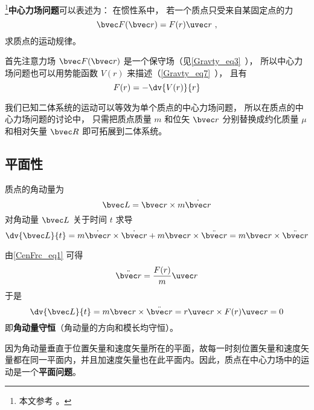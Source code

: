 
\footnote{本文参考 \cite{Goldstein}。}\textbf{中心力场问题}可以表述为： 在惯性系中， 若一个质点只受来自某固定点的力
\begin{equation}\label{CenFrc_eq1}
\bvec F(\bvec r) = F(r) \uvec r~,
\end{equation}
求质点的运动规律。

首先注意力场 $\bvec F(\bvec r)$ 是一个保守场（见\autoref{Gravty_eq3}~）， 所以中心力场问题也可以用势能函数 $V(r)$ 来描述（\autoref{Gravty_eq7}~）， 且有
\begin{equation}
F(r) = -\dv{V(r)}{r}
\end{equation}

我们已知二体系统的运动可以等效为单个质点的中心力场问题， 所以在质点的中心力场问题的讨论中， 只需把质点质量 $m$ 和位矢 $\bvec r$ 分别替换成约化质量 $\mu$ 和相对矢量 $\bvec R$ 即可拓展到二体系统。

\subsection{平面性}
质点的角动量为
\begin{equation}
\bvec L =\bvec r \times m \dot{\bvec r}
\end{equation}
对角动量 $\bvec L$ 关于时间 $t$ 求导
\begin{equation}
\dv{\bvec L}{t} =m \dot{\bvec r} \times \dot{\bvec r} +m \bvec r \times \ddot{\bvec r}=m \bvec r \times \ddot{\bvec r}
\end{equation}

由\autoref{CenFrc_eq1} 可得
\begin{equation}
\ddot{\bvec r} = \frac{F(r)}{m}\uvec r
\end{equation}
于是
\begin{equation}
\dv{\bvec L}{t} =m \bvec r \times \ddot{\bvec r}= r \uvec r \times F(r)\uvec r=0
\end{equation}
即\textbf{角动量守恒}（角动量的方向和模长均守恒）。

因为角动量垂直于位置矢量和速度矢量所在的平面，故每一时刻位置矢量和速度矢量都在同一平面内，并且加速度矢量也在此平面内。因此，质点在中心力场中的运动是一个\textbf{平面问题}。

